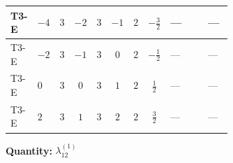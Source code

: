 \documentclass[8pt]{article}
\begin{document}
\begin{landscape}
\begin{longtable}{@{}llcccccc >{\raggedright\arraybackslash}p{0.21\linewidth} >{\raggedright\arraybackslash}p{0.21\linewidth} >{\raggedright\arraybackslash}p{0.21\linewidth}@{}}
\midrule
T3-E & $-4$ & $3$ & $-2$ & $3$ & $-1$ & $2$ & $-\frac{3}{2}$ & --- & \scriptsize\adjustbox{max width=\linewidth}{$\begin{gathered} -2 \operatorname{Tr}\!\left({y_1}\,\left({y_1}\right)^{\dagger}\,{y_2}\,\left({y_2}\right)^{\dagger}\right)\end{gathered}$} & --- \\
\midrule
T3-E & $-2$ & $3$ & $-1$ & $3$ & $0$ & $2$ & $-\frac{1}{2}$ & --- & \scriptsize\adjustbox{max width=\linewidth}{$\begin{gathered} -2 \operatorname{Tr}\!\left({y_1}\,\left({y_1}\right)^{\dagger}\,{y_2}\,\left({y_2}\right)^{\dagger}\right)\end{gathered}$} & --- \\
\midrule
T3-E & $0$ & $3$ & $0$ & $3$ & $1$ & $2$ & $\frac{1}{2}$ & --- & \scriptsize\adjustbox{max width=\linewidth}{$\begin{gathered} -2 \operatorname{Tr}\!\left({y_1}\,\left({y_1}\right)^{\dagger}\,{y_2}\,\left({y_2}\right)^{\dagger}\right)\end{gathered}$} & --- \\
\midrule
T3-E & $2$ & $3$ & $1$ & $3$ & $2$ & $2$ & $\frac{3}{2}$ & --- & \scriptsize\adjustbox{max width=\linewidth}{$\begin{gathered} -2 \operatorname{Tr}\!\left({y_1}\,\left({y_1}\right)^{\dagger}\,{y_2}\,\left({y_2}\right)^{\dagger}\right)\end{gathered}$} & --- \\
\midrule
\bottomrule
\end{longtable}
\clearpage
\noindent\textbf{Quantity: }$\lambda_{12}^{(1)}$\par\smallskip

\end{landscape}
\end{document}
